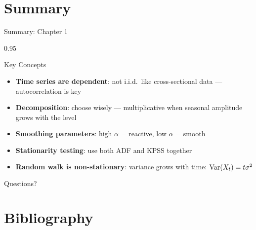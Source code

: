 \documentclass[9pt, aspectratio=169, t]{beamer}
\begin{document}
\section{Summary}

\begin{frame}{Summary: Chapter 1}
    \begin{cminipage}{0.95\textwidth}
    \begin{exampleblock}{Key Concepts}
        \begin{itemize}\setlength{\itemsep}{2pt}
            \item[\textcolor{MainBlue}{\textbf{1.}}] \textbf{Time series are dependent}: not i.i.d.\ like cross-sectional data --- autocorrelation is key
            \item[\textcolor{MainBlue}{\textbf{2.}}] \textbf{Decomposition}: choose wisely --- multiplicative when seasonal amplitude grows with the level
            \item[\textcolor{MainBlue}{\textbf{3.}}] \textbf{Smoothing parameters}: high $\alpha$ = reactive, low $\alpha$ = smooth
            \item[\textcolor{MainBlue}{\textbf{4.}}] \textbf{Stationarity testing}: use both ADF and KPSS together
            \item[\textcolor{MainBlue}{\textbf{5.}}] \textbf{Random walk is non-stationary}: variance grows with time: $\text{Var}(X_t) = t\sigma^2$
        \end{itemize}
    \end{exampleblock}

    \vspace{0.5cm}
    \begin{center}
        \Large\textcolor{MainBlue}{Questions?}
    \end{center}
    \end{cminipage}
\end{frame}

\section{Bibliography}
\end{document}
